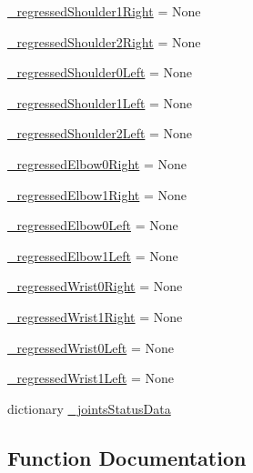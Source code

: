 \begin{DoxyCompactItemize}
\mbox{\hyperlink{namespacesteering__trajectory__test_a21afcec7a504e6cf3bab34c418a9c51b}{\+\_\+regressed\+Shoulder1\+Right}} = None
\item 
\mbox{\hyperlink{namespacesteering__trajectory__test_a96a3ab6b80583f8f176f9e5dabebea58}{\+\_\+regressed\+Shoulder2\+Right}} = None
\item 
\mbox{\hyperlink{namespacesteering__trajectory__test_ab5ad5fd50cfc5a873796b155f655eee8}{\+\_\+regressed\+Shoulder0\+Left}} = None
\item 
\mbox{\hyperlink{namespacesteering__trajectory__test_a69d61537b419b03eecc3ac206558881f}{\+\_\+regressed\+Shoulder1\+Left}} = None
\item 
\mbox{\hyperlink{namespacesteering__trajectory__test_ac2973dada24408e24f73d1ac6208bc1a}{\+\_\+regressed\+Shoulder2\+Left}} = None
\item 
\mbox{\hyperlink{namespacesteering__trajectory__test_a1f19110d850f2dfcc7035c8c2dcd54cb}{\+\_\+regressed\+Elbow0\+Right}} = None
\item 
\mbox{\hyperlink{namespacesteering__trajectory__test_a8b04671fef427724794561f65088a428}{\+\_\+regressed\+Elbow1\+Right}} = None
\item 
\mbox{\hyperlink{namespacesteering__trajectory__test_ab85b21eb7cd455cd1f78710802a9b7d1}{\+\_\+regressed\+Elbow0\+Left}} = None
\item 
\mbox{\hyperlink{namespacesteering__trajectory__test_a466f3a65d8a593ab4e26c21135e02d5e}{\+\_\+regressed\+Elbow1\+Left}} = None
\item 
\mbox{\hyperlink{namespacesteering__trajectory__test_a93825f131482bb4613e8085c1dd8ef57}{\+\_\+regressed\+Wrist0\+Right}} = None
\item 
\mbox{\hyperlink{namespacesteering__trajectory__test_a3af3eb5238a8040dc8ea9bab570069df}{\+\_\+regressed\+Wrist1\+Right}} = None
\item 
\mbox{\hyperlink{namespacesteering__trajectory__test_ad78e63f31901346311fcdb4ddb97190f}{\+\_\+regressed\+Wrist0\+Left}} = None
\item 
\mbox{\hyperlink{namespacesteering__trajectory__test_a5f2944452c794cd41a810ab546f6a343}{\+\_\+regressed\+Wrist1\+Left}} = None
\item 
dictionary \mbox{\hyperlink{namespacesteering__trajectory__test_a5db9b7010905532e175537e1aced8823}{\+\_\+joints\+Status\+Data}}
\end{DoxyCompactItemize}


\subsection{Function Documentation}
\mbox{\label{namespacesteering__trajectory__test_a0e80a2f8f36f677d6d69214a4857fe27}} 
